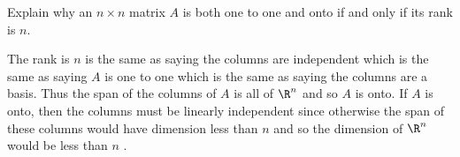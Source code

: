 \begin{enumialphparenastyle}
\begin{ex} Explain why an $n\times n$ matrix $A$ is both one to one and onto if
and only if its rank is $n.$ \vspace{1mm}
\begin{sol}
The rank is $n$ is the same as saying the
columns are independent which is the same as saying $A$ is one to one which
is the same as saying the columns are a basis. Thus the span of the columns
of $A$ is all of $\R^{n}$ and so $A$ is onto. If $A$ is onto, then
the columns must be linearly independent since otherwise the span of these
columns would have dimension less than $n$ and so the dimension of $\R^{n}$ would be less than $n$ .
\end{sol}
\end{ex}

\end{enumialphparenastyle}
